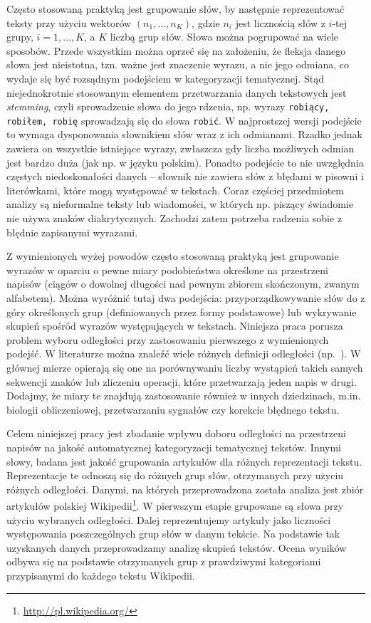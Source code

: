 \documentclass{praca1}
\begin{document}
Często stosowaną praktyką jest grupowanie słów, by następnie reprezentować teksty przy użyciu wektorów $(n_1,\ldots, n_K)$, gdzie $n_i$ jest licznością słów z $i$-tej grupy, $i = 1,\ldots,K$, a $K$ liczbą grup słów. Słowa można pogrupować na wiele sposobów. Przede wszystkim można oprzeć się na założeniu, że fleksja danego słowa jest nieistotna, tzn. ważne jest znaczenie wyrazu, a nie jego odmiana, co wydaje się być rozsądnym podejściem w kategoryzacji tematycznej. Stąd niejednokrotnie stosowanym elementem przetwarzania danych tekstowych jest \emph{stemming}, czyli sprowadzenie słowa do jego rdzenia, np. wyrazy \verb|robiący, robiłem, robię| sprowadzają się do słowa \verb|robić|. W najprostszej wersji podejście to wymaga dysponowania słownikiem słów wraz z ich odmianami. Rzadko jednak zawiera on wszystkie istniejące wyrazy, zwłaszcza gdy liczba możliwych odmian jest bardzo duża (jak np. w języku polskim). Ponadto podejście to nie uwzględnia częstych niedoskonałości danych -- słownik nie zawiera słów z błędami w pisowni i literówkami, które mogą występować w tekstach. Coraz częściej przedmiotem analizy są nieformalne teksty lub wiadomości, w których np. piszący świadomie nie używa znaków diakrytycznych. Zachodzi zatem potrzeba radzenia sobie z błędnie zapisanymi wyrazami. 

Z wymienionych wyżej powodów często stosowaną praktyką jest grupowanie wyrazów w oparciu o pewne miary podobieństwa określone na przestrzeni napisów (ciągów o dowolnej długości nad pewnym zbiorem skończonym, zwanym alfabetem). Można wyróżnić tutaj dwa podejścia: przyporządkowywanie słów do z góry określonych grup (definiowanych przez formy podstawowe) lub wykrywanie skupień spośród wyrazów występujących w tekstach. Niniejsza praca porusza problem wyboru odległości przy zastosowaniu pierwszego z wymienionych podejść. W literaturze można znaleźć wiele różnych definicji odległości (np.~\cite{Levenshtein1965:binarycodes, Boytsov2011:indexingmethods, Navarro2001:guidedtour}). W głównej mierze opierają się one na porównywaniu liczby wystąpień takich samych sekwencji znaków lub zliczeniu operacji, które przetwarzają jeden napis w drugi. Dodajmy, że miary te znajdują zastosowanie również w innych dziedzinach, m.in. biologii obliczeniowej, przetwarzaniu sygnałów czy korekcie błędnego tekstu.


Celem niniejszej pracy jest zbadanie wpływu doboru odległości na przestrzeni napisów na jakość automatycznej kategoryzacji tematycznej tekstów. Innymi słowy, badana jest jakość grupowania artykułów dla różnych reprezentacji tekstu. Reprezentacje te odnoszą się do różnych grup słów, otrzymanych przy użyciu różnych odległości. Danymi, na których przeprowadzona została analiza jest zbiór artykułów polskiej Wikipedii\footnote{\url{http://pl.wikipedia.org/}}. W pierwszym etapie grupowane są słowa przy użyciu wybranych odległości. Dalej reprezentujemy artykuły jako liczności występowania poszczególnych grup słów w danym tekście. Na podstawie tak uzyskanych danych przeprowadzamy analizę skupień tekstów. Ocena wyników odbywa się na podstawie otrzymanych grup z prawdziwymi kategoriami przypisanymi do każdego tekstu Wikipedii.
\end{document}
